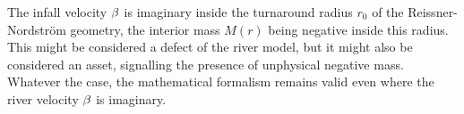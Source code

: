 \documentclass[twocolumn,showpacs,preprintnumbers,amsmath,amssymb,prb]{revtex4}
\begin{document}


The infall velocity $\beta$ is imaginary inside the turnaround radius $r_0$
of the Reissner-Nordstr\"om geometry,
the interior mass $M(r)$ being negative inside this radius.
This might be considered a defect of the river model,
but it might also be considered an asset,
signalling the presence of
unphysical negative mass.
Whatever the case,
the mathematical formalism remains valid
even where the river velocity $\beta$ is imaginary.
\end{document}
